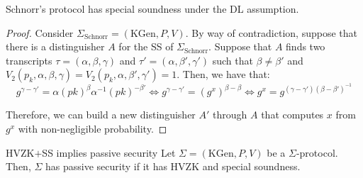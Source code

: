 \documentclass[a4paper, 12pt]{report}
\begin{document}
    \begin{framedprop}{}
        Schnorr's protocol has special soundness under the DL assumption.
    \end{framedprop}

    \begin{proof}
        Consider $\Sigma_{\text{Schnorr}} = (\mathrm{KGen}, P, V)$. By way of contradiction, suppose that there is a distinguisher $A$ for the SS of $\Sigma_{\text{Schnorr}}$. Suppose that $A$ finds two transcripts $\tau = (\alpha, \beta, \gamma)$ and $\tau' = (\alpha, \beta', \gamma')$ such that $\beta \neq \beta'$ and $V_2(p_k, \alpha, \beta, \gamma) = V_2(p_k, \alpha, \beta', \gamma') = 1$. Then, we have that:
        \[g^{\gamma-\gamma'} = \alpha(pk)^{\beta} \alpha^{-1} (pk)^{-\beta'} \iff g^{\gamma-\gamma'} = (g^x)^{\beta- \beta} \iff g^x = g^{(\gamma-\gamma')(\beta-\beta')^{-1}}\]

        Therefore, we can build a new distinguisher $A'$ through $A$ that computes $x$ from $g^x$ with non-negligible probability.
    \end{proof}

    \begin{framedthm}{HVZK$+$SS implies passive security}
        Let $\Sigma = (\mathrm{KGen}, P, V)$ be a $\Sigma$-protocol. Then, $\Sigma$ has passive security if it has HVZK and special soundness.
    \end{framedthm}
\end{document}
